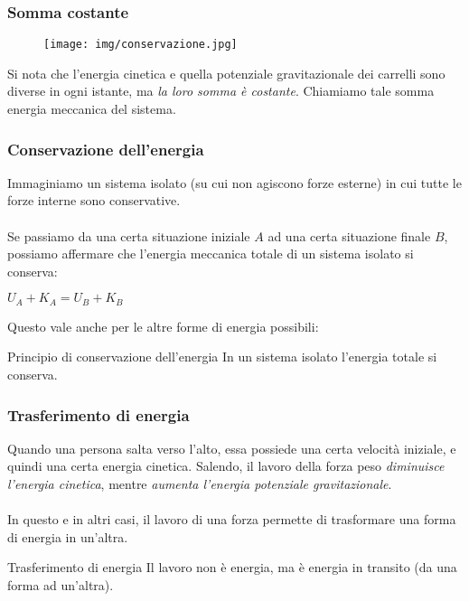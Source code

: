 \documentclass[]{beamer}
\theoremstyle{plain}
\begin{document}
\begin{frame}
  \frametitle{Somma costante}
  \begin{figure}
  \texttt{[image: img/conservazione.jpg]}
\end{figure}\pause
Si nota che l'energia cinetica e quella potenziale gravitazionale dei carrelli sono diverse in ogni istante, ma \emph{la loro somma è costante}. Chiamiamo tale somma \alert{energia meccanica del sistema}.
\end{frame}


\begin{frame}
  \frametitle{Conservazione dell'energia}
  Immaginiamo un sistema isolato (su cui non agiscono forze esterne) in cui tutte le forze interne sono conservative.\\~\pause\\  
  Se passiamo da una certa situazione iniziale $ A $ ad una certa situazione finale $ B $, possiamo affermare che \alert<2>{l'energia meccanica totale di un sistema isolato si conserva}:
\begin{center}
\colorbox{blue!30}{$ U_A + K_A = U_B + K_B $}
\end{center}\pause
Questo vale anche per le altre forme di energia possibili:
\begin{block}{Principio di conservazione dell'energia}
  In un sistema isolato l'energia totale si conserva.
\end{block}
\end{frame}


\begin{frame}
\frametitle{Trasferimento di energia}
  Quando una persona salta verso l'alto, essa possiede una certa velocità iniziale, e quindi una certa energia cinetica. Salendo, il lavoro della forza peso \emph<1>{diminuisce l'energia cinetica}, mentre \emph<1>{aumenta l'energia potenziale gravitazionale}.\\~\pause\\In questo e in altri casi, \alert<2>{il lavoro di una forza permette di trasformare una forma di energia in un'altra}.\pause
\begin{block}{Trasferimento di energia}
Il lavoro non è energia, ma è energia in transito (da una forma ad un'altra).
\end{block}
\end{frame}
\end{document}
